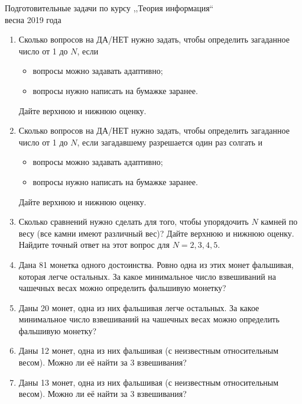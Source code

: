 \documentclass[a4paper]{article}
\begin{document}
\begin{center}
    \Large Подготовительные задачи по курсу ,,Теория информация``\\
    весна 2019 года
\end{center}

\begin{enumerate}
    \item Сколько вопросов на ДА/НЕТ нужно задать, чтобы определить загаданное число от 1 до \(N\), если 
    \begin{itemize}
        \item вопросы можно задавать адаптивно;
        \item вопросы нужно написать на бумажке заранее.
    \end{itemize}
    Дайте верхнюю и нижнюю оценку.

    \item Сколько вопросов на ДА/НЕТ нужно задать, чтобы определить загаданное число от 1 до \(N\), если загадавшему разрешается один раз солгать и
    \begin{itemize}
        \item вопросы можно задавать адаптивно;
        \item вопросы нужно написать на бумажке заранее.
    \end{itemize}
    Дайте верхнюю и нижнюю оценку.

    
    \item Сколько сравнений нужно сделать для того, чтобы упорядочить \(N\) камней по весу (все камни имеют различный вес)? 
    Дайте верхнюю и нижнюю оценку. Найдите точный ответ на этот вопрос для \(N = 2, 3, 4, 5\). 
    
    \item Дана 81 монетка одного достоинства. Ровно одна из этих монет фальшивая, которая легче остальных.
    За какое минимальное число взвешиваний на чашечных весах можно определить фальшивую монетку?
    
    \item Даны 20 монет, одна из них фальшивая легче остальных.
    За какое минимальное число взвешиваний на чашечных весах можно определить фальшивую монетку?
        
    \item Даны 12 монет, одна из них фальшивая (с неизвестным относительным весом). Можно ли её найти за 3 взвешивания?
               
    \item Даны 13 монет, одна из них фальшивая (с неизвестным относительным весом). Можно ли её найти за 3 взвешивания?
                

\end{enumerate}
\end{document}
